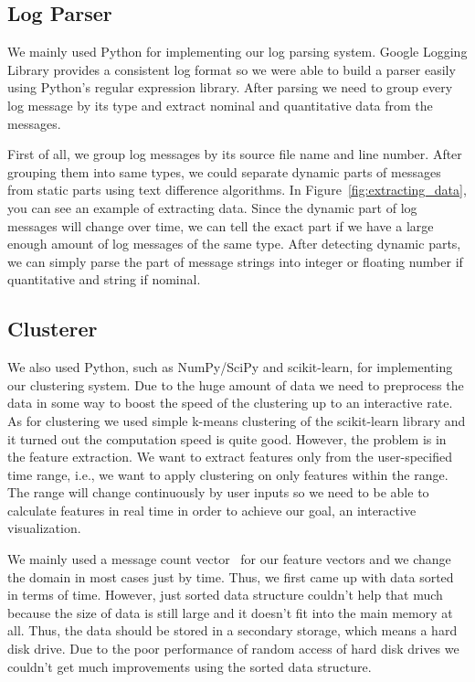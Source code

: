 \documentclass[conference]{style/acmsiggraph}
\begin{document}
\subsection{Log Parser}
We mainly used Python for implementing our log parsing system. Google Logging Library provides a
consistent log format so we were able to build a parser easily using Python's regular expression
library. After parsing we need to group every log message by its type and extract nominal and
quantitative data from the messages.

First of all, we group log messages by its source file name and line number. After grouping them
into same types, we could separate dynamic parts of messages from static parts using text difference
algorithms. In Figure~\ref{fig:extracting_data}, you can see an example of extracting data. Since
the dynamic part of log messages will change over time, we can tell the exact part if we have a
large enough amount of log messages of the same type. After detecting dynamic parts, we can simply
parse the part of message strings into integer or floating number if quantitative and string if
nominal.

\subsection{Clusterer}
We also used Python, such as NumPy/SciPy and scikit-learn, for implementing our clustering system.
Due to the huge amount of data we need to preprocess the data in some way to boost the speed of the
clustering up to an interactive rate. As for clustering we used simple k-means clustering
\cite{kmeans,Lloyd82} of the scikit-learn library \cite{scikit-learn} and it turned out the
computation speed is quite good. However, the problem is in the feature extraction. We want to
extract features only from the user-specified time range, i.e., we want to apply clustering on only
features within the range. The range will change continuously by user inputs so we need to be able
to calculate features in real time in order to achieve our goal, an interactive visualization.

We mainly used a message count vector~\cite{Xu09} for our feature vectors and we change the domain
in most cases just by time. Thus, we first came up with data sorted in terms of time. However, just
sorted data structure couldn't help that much because the size of data is still large and it doesn't
fit into the main memory at all. Thus, the data should be stored in a secondary storage, which means
a hard disk drive. Due to the poor performance of random access of hard disk drives we couldn't get
much improvements using the sorted data structure.
\end{document}
